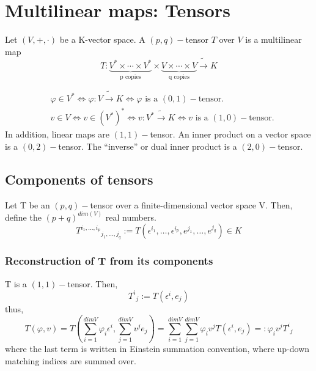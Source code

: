 \documentclass[root.tex]{subfiles}
\begin{document}

\chapter{Multilinear maps: Tensors}%
\begin{mydef}
  Let $(V,+,\cdot)$ be a K-vector space. A $(p,q)-$tensor $T$ over $V$ is a multilinear map
  $$
  T: \underbrace{V^* \times \cdots \times V^*}_{\text{p copies}} \times \underbrace{V \times \cdots \times V}_{\text{q copies}} \tilde{\longrightarrow} K
  $$
\end{mydef}
\begin{myex}
  $$
  \begin{aligned}
  &\varphi \in V^* \Leftrightarrow \varphi : V \tilde{\longrightarrow} K \Leftrightarrow \varphi \text{ is a $(0,1)-$tensor.}\\
  & v \in V \Leftrightarrow v \in \left( V^*\right)^* \Leftrightarrow v: V^* \tilde{\longrightarrow} K \Leftrightarrow v \text{ is a $(1,0)-$tensor.}
  \end{aligned}
  $$
  In addition, linear maps are $(1,1)-$tensor. An inner product on a vector space is a $(0,2)-$tensor. The ``inverse'' or dual inner product is a $(2,0)-$tensor.
\end{myex}

\section{Components of tensors}
\begin{mydef}
  Let T be an $(p,q)-$tensor over a finite-dimensional vector space V. Then, define the $(p+q)^{dim(V)}$ real numbers.
  $$
  T^{i_1,\ldots, i_p}{}_{j_1, \ldots, j_q} := T(\epsilon^{i_1}, \ldots, \epsilon^{i_p}, e^{j_1}, \ldots, e^{j_q}) \in K
  $$
\end{mydef}
\subsection{Reconstruction of T from its components}
\begin{myex}
  T is a $(1,1)-$tensor. Then,
  $$
  T^i{}_j := T(\epsilon^i, e_j)
  $$
  thus,
  $$
  T(\varphi,v) = T(\sum_{i=1}^{dimV}\varphi_i \epsilon^i, \sum_{j=1}^{dimV}v^j e_j) = 
  \sum_{i=1}^{dimV}\sum_{j=1}^{dimV}\varphi_i v^j T(\epsilon^i,  e_j) =: \varphi_i v^j T^i{}_j 
  $$
  where the last term is written in Einstein summation convention, where up-down matching indices are summed over.
\end{myex}
\end{document}
